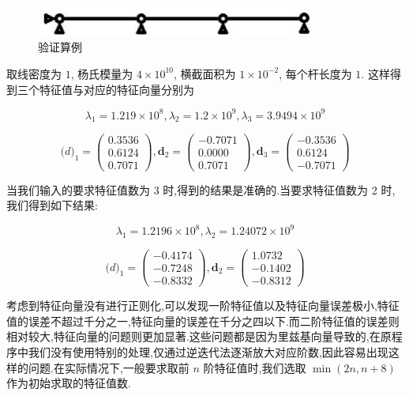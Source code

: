 \begin{figure}[htbp]
  \centering
  \includegraphics[height=1cm]{modalex}
  \caption{验证算例}
\end{figure}

取线密度为 $1$, 杨氏模量为 $4\times 10^{10}$, 横截面积为 $1\times 10^{-2}$, 每个杆长度为 $1$. 这样得到三个特征值与对应的特征向量分别为

\[
\lambda_1=1.219\times10^8,\lambda_2=1.2\times10^9,\lambda_3=3.9494\times10^9 \]

\[
\mathbf(d)_1=\left( \begin{array}{c} 0.3536 \\ 0.6124 \\ 0.7071 \end{array} \right),
\mathbf{d}_2=\left( \begin{array}{c} -0.7071 \\ 0.0000 \\ 0.7071 \end{array} \right),
\mathbf{d}_3=\left( \begin{array}{c} -0.3536 \\ 0.6124 \\ -0.7071 \end{array} \right) \]

当我们输入的要求特征值数为 3 时,得到的结果是准确的.当要求特征值数为 2 时,我们得到如下结果:

\[
\lambda_1=1.2196\times10^8,\lambda_2=1.24072\times10^9 \]

\[
\mathbf(d)_1=\left( \begin{array}{c} -0.4174 \\ -0.7248 \\ -0.8332 \end{array} \right),
\mathbf{d}_2=\left( \begin{array}{c} 1.0732 \\ -0.1402 \\ -0.8312 \end{array} \right) \]

考虑到特征向量没有进行正则化,可以发现一阶特征值以及特征向量误差极小,特征值的误差不超过千分之一,特征向量的误差在千分之四以下.而二阶特征值的误差则相对较大,特征向量的问题则更加显著.这些问题都是因为里兹基向量导致的,在原程序中我们没有使用特别的处理,仅通过逆迭代法逐渐放大对应阶数,因此容易出现这样的问题.在实际情况下,一般要求取前 $n$ 阶特征值时,我们选取 $\min (2n,n+8)$ 作为初始求取的特征值数.

